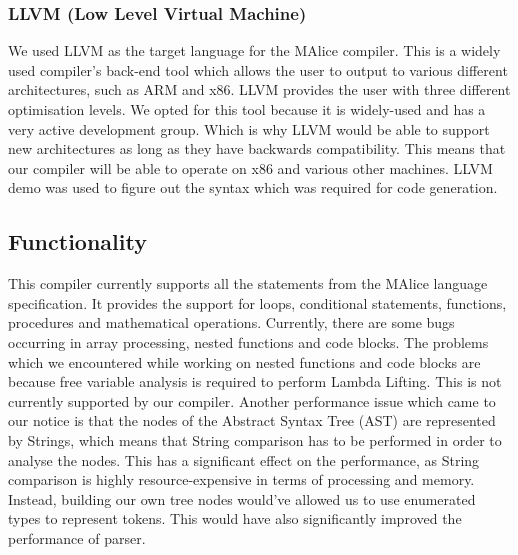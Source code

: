 \documentclass[a4wide, 11pt]{article}
\begin{document}
		\subsubsection{LLVM (Low Level Virtual Machine)}
			We used LLVM as the target language for the MAlice compiler. This is a widely used compiler's back-end tool which
			allows the user to output to various different architectures, such as ARM and x86. LLVM provides the user
			with three different optimisation levels. We opted for this tool because
			it is widely-used and has a very active development group. Which is why LLVM would be able to support
			new architectures as long as they have backwards compatibility. This means that our compiler will be 
			able to operate on x86 and various other machines. LLVM demo\cite{demo} was used to figure out the syntax which was required
			for code generation.
		
	\subsection{Functionality}			
		This compiler currently supports all the statements from the MAlice language specification. It provides
		the support for loops, conditional statements, functions, procedures and mathematical operations. Currently, there are some bugs
		occurring in array processing, nested functions and code blocks. The problems which we encountered while working on 
		nested functions and code blocks are because free variable analysis is required to perform Lambda Lifting.
		 This is not currently supported by our compiler. Another performance issue which came to our notice is that
		 the nodes of the Abstract Syntax Tree (AST) are represented by Strings, which means that String comparison
		  has to be performed in order to analyse the nodes. This has a significant effect on the performance, as String 
		  comparison is highly resource-expensive in terms of processing and memory. Instead, building our own tree 
		  nodes would've allowed us to use enumerated types to represent tokens. This would have also significantly 
		  improved the performance of parser.
	
\end{document}
